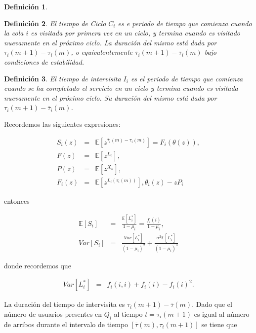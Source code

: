 \documentclass{article}
\newtheorem{Def}{Definición}[section]
\newcommand{\esp}{\mathbb{E}}
\numberwithin{equation}{section}
\begin{document}
{\begin{Def}
\end{Def}

\begin{Def}
El tiempo de Ciclo $C_{i}$ es e periodo de tiempo que comienza cuando la cola $i$ es visitada por primera vez en un ciclo, y termina cuando es visitado nuevamente en el pr\'oximo ciclo. La duraci\'on del mismo est\'a dada por $\tau_{i}\left(m+1\right)-\tau_{i}\left(m\right)$, o equivalentemente $\overline{\tau}_{i}\left(m+1\right)-\overline{\tau}_{i}\left(m\right)$ bajo condiciones de estabilidad.
\end{Def}

\begin{Def}
El tiempo de intervisita $I_{i}$ es el periodo de tiempo que comienza cuando se ha completado el servicio en un ciclo y termina cuando es visitada nuevamente en el pr\'oximo ciclo. Su  duraci\'on del mismo est\'a dada por $\tau_{i}\left(m+1\right)-\overline{\tau}_{i}\left(m\right)$.
\end{Def}


Recordemos las siguientes expresiones:

\begin{eqnarray*}
S_{i}\left(z\right)&=&\esp\left[z^{\overline{\tau}_{i}\left(m\right)-\tau_{i}\left(m\right)}\right]=F_{i}\left(\theta\left(z\right)\right),\\
F\left(z\right)&=&\esp\left[z^{L_{0}}\right],\\
P\left(z\right)&=&\esp\left[z^{X_{n}}\right],\\
F_{i}\left(z\right)&=&\esp\left[z^{L_{i}\left(\tau_{i}\left(m\right)\right)}\right],
\theta_{i}\left(z\right)-zP_{i}
\end{eqnarray*}

entonces 

\begin{eqnarray*}
\esp\left[S_{i}\right]&=&\frac{\esp\left[L_{i}^{*}\right]}{1-\mu_{i}}=\frac{f_{i}\left(i\right)}{1-\mu_{i}},\\
Var\left[S_{i}\right]&=&\frac{Var\left[L_{i}^{*}\right]}{\left(1-\mu_{i}\right)^{2}}+\frac{\sigma^{2}\esp\left[L_{i}^{*}\right]}{\left(1-\mu_{i}\right)^{3}}
\end{eqnarray*}

donde recordemos que

\begin{eqnarray*}
Var\left[L_{i}^{*}\right]&=&f_{i}\left(i,i\right)+f_{i}\left(i\right)-f_{i}\left(i\right)^{2}.
\end{eqnarray*}

La duraci\'on del tiempo de intervisita es $\tau_{i}\left(m+1\right)-\overline{\tau}\left(m\right)$. Dado que el n\'umero de usuarios presentes en $Q_{i}$ al tiempo $t=\tau_{i}\left(m+1\right)$ es igual al n\'umero de arribos durante el intervalo de tiempo $\left[\overline{\tau}\left(m\right),\tau_{i}\left(m+1\right)\right]$ se tiene que


}
\end{document}
